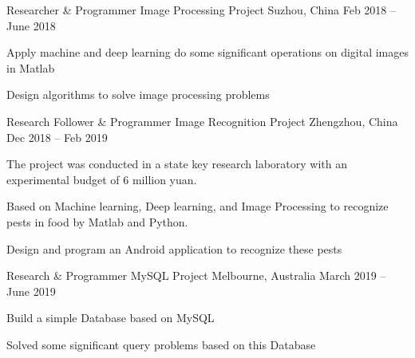 \begin{cventries}
  \cventry
    {Researcher \& Programmer} %
    {Image Processing Project} %
    {Suzhou, China} %
    {Feb 2018 – June 2018} %
    {
      \begin{cvitems} %
        \item {Apply machine and deep learning do some significant operations on digital images in Matlab}
        \item {Design algorithms to solve image processing problems}
      \end{cvitems}
    }

  \cventry
    {Research Follower \& Programmer} %
    {Image Recognition Project } %
    {Zhengzhou, China} %
    {Dec 2018 – Feb 2019} %
    {
      \begin{cvitems} %
        \item{The project was conducted in a state key research laboratory with an experimental budget of 6 million yuan.}
        \item {Based on Machine learning, Deep learning, and Image Processing to recognize pests in food by Matlab and Python.}
        \item {Design and program an Android application to recognize these pests}
      \end{cvitems}
    }
    
\cventry
    {Research \& Programmer} %
    {MySQL Project} %
    {Melbourne, Australia} %
    {March 2019 – June 2019} %
    {
      \begin{cvitems} %
        \item {Build a simple Database based on MySQL}
        \item {Solved some significant query problems based on this Database}
      \end{cvitems}
    }
    


\end{cventries}

